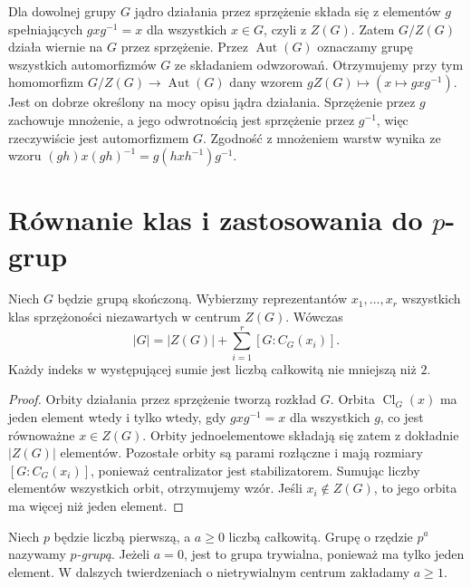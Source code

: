 \begin{przyklad}
Dla dowolnej grupy $G$ jądro działania przez sprzężenie
składa się z elementów $g$ spełniających
$gxg^{-1}=x$ dla wszystkich $x\in G$, czyli z $Z(G)$.
Zatem $G/Z(G)$ działa wiernie na $G$ przez sprzężenie.
Przez $\operatorname{Aut}(G)$ oznaczamy grupę
wszystkich automorfizmów $G$ ze składaniem odwzorowań.
Otrzymujemy przy tym homomorfizm
$G/Z(G)\to\operatorname{Aut}(G)$ dany wzorem
$gZ(G)\mapsto(x\mapsto gxg^{-1})$. Jest on dobrze określony
na mocy opisu jądra działania. Sprzężenie przez $g$
zachowuje mnożenie, a jego odwrotnością jest sprzężenie
przez $g^{-1}$, więc rzeczywiście jest automorfizmem $G$.
Zgodność z mnożeniem warstw wynika ze wzoru
$(gh)x(gh)^{-1}=g(hxh^{-1})g^{-1}$.
\end{przyklad}

\section{Równanie klas i zastosowania do \texorpdfstring{$p$}{p}-grup}
\begin{twierdzenie}
\label{aa:tw:rownanie-klas}
Niech $G$ będzie grupą skończoną.
Wybierzmy reprezentantów $x_1,\ldots,x_r$ wszystkich
klas sprzężoności niezawartych w centrum $Z(G)$.
Wówczas
\[
 |G|=|Z(G)|+\sum_{i=1}^{r}[G:C_G(x_i)].
\]
Każdy indeks w występującej sumie jest liczbą całkowitą
nie mniejszą niż $2$.
\end{twierdzenie}
\begin{proof}
Orbity działania przez sprzężenie tworzą rozkład $G$.
Orbita $\operatorname{Cl}_G(x)$ ma jeden element wtedy i tylko wtedy,
gdy $gxg^{-1}=x$ dla wszystkich $g$, co jest równoważne
$x\in Z(G)$. Orbity jednoelementowe składają się zatem
z dokładnie $|Z(G)|$ elementów.
Pozostałe orbity są parami rozłączne i mają rozmiary
$[G:C_G(x_i)]$, ponieważ centralizator jest stabilizatorem.
Sumując liczby elementów wszystkich orbit, otrzymujemy wzór.
Jeśli $x_i\notin Z(G)$, to jego orbita ma więcej niż jeden element.
\end{proof}

\begin{definicja}
Niech $p$ będzie liczbą pierwszą, a $a\ge0$ liczbą całkowitą.
Grupę o rzędzie $p^a$ nazywamy \emph{$p$-grupą}.
Jeżeli $a=0$, jest to grupa trywialna, ponieważ ma tylko
jeden element. W dalszych twierdzeniach o nietrywialnym
centrum zakładamy $a\ge1$.
\end{definicja}

